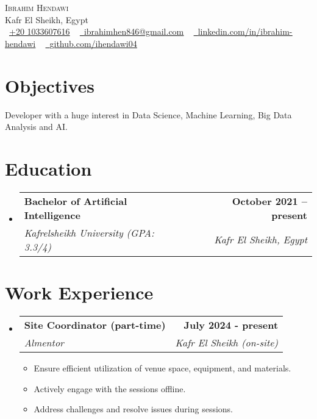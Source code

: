 \documentclass[letterpaper,11pt]{article}
\makeatletter
\newcommand{\resumeItem}[1]{
  \item\small{
    {#1 \vspace{-2pt}}
  }
}
\newcommand{\resumeSubheading}[4]{
  \vspace{-2pt}\item
    \begin{tabular*}{1.0\textwidth}[t]{l@{\extracolsep{\fill}}r}
      \textbf{#1} & \textbf{\small #2} \\
      \textit{\small#3} & \textit{\small #4} \\
    \end{tabular*}\vspace{-7pt}
}
\newcommand{\resumeSubHeadingListStart}{\begin{itemize}[leftmargin=0.0in, label={}]}
\newcommand{\resumeSubHeadingListEnd}{\end{itemize}}
\newcommand{\resumeItemListStart}{\begin{itemize}}
\newcommand{\resumeItemListEnd}{\end{itemize}\vspace{-5pt}}
\makeatother
\begin{document}
\begin{center}


  {\Huge \scshape Ibrahim Hendawi} \\ \vspace{1pt}
  Kafr El Sheikh, Egypt \\ \vspace{1pt}
  \small
  {\raisebox{-0.1\height}
  \faPhone\ 
  \underline{+20 1033607616}} ~ 
  \href{mialto:ibrahimhen846@gmail.com}
  {\raisebox{-0.2\height}
  \faEnvelope\
  \underline{ibrahimhen846@gmail.com}} ~
  \href{https://www.linkedin.com/in/ibrahim-hendawi-7a5655217/}
  {\raisebox{-0.2\height}
  \faLinkedin\ 
  \underline{linkedin.com/in/ibrahim-hendawi}}  ~
  \href{https://github.com/ihendawi04}
  {\raisebox{-0.2\height}
  \faGithub\ 
  \underline{github.com/ihendawi04}}
  \vspace{-8pt}


\end{center}


\section{Objectives}
Developer with a huge interest in Data Science, Machine Learning, Big Data Analysis and AI.


\section{Education}
  \resumeSubHeadingListStart
    \resumeSubheading
      {Bachelor of Artificial Intelligence}{October 2021 -- present}
      {Kafrelsheikh University (GPA: 3.3/4)}{Kafr El Sheikh, Egypt}
      
  \resumeSubHeadingListEnd
  \vspace{-13pt}


\section{Work Experience}
  \resumeSubHeadingListStart
    \resumeSubheading
      {Site Coordinator (part-time)}{July 2024 - present}
      {Almentor}{Kafr El Sheikh (on-site)}
      \resumeItemListStart
        \resumeItem{
          Ensure efficient utilization of venue space, equipment, and materials.
        }
        \resumeItem{
          Actively engage with the sessions offline.
        }
        \resumeItem{
          Address challenges and resolve issues during sessions.
        }
      \resumeItemListEnd
  \resumeSubHeadingListEnd
\end{document}
